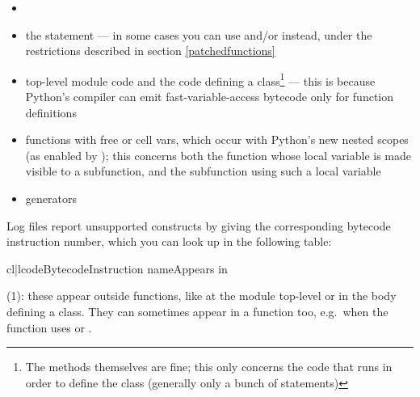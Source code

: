 \documentclass{manual}
\begin{document}
\begin{itemize}

\item {}

\item the  statement --- in some cases you can use  and/or  instead, under the restrictions described in section \ref{patchedfunctions}

\item top-level module code and the code defining a class\footnote{The methods themselves are fine; this only concerns the code that runs in order to define the class (generally only a bunch of  statements)} --- this is because Python's compiler can emit fast-variable-access bytecode only for function definitions

\item functions with free or cell vars, which occur with Python's new nested scopes (as enabled by ); this concerns both the function whose local variable is made visible to a subfunction, and the subfunction using such a local variable

\item generators

\end{itemize}

Log files report unsupported constructs by giving the corresponding bytecode instruction number, which you can look up in the following table:

\begin{tableiii}{cl|l}{code}{Bytecode}{Instruction name}{Appears in}
\end{tableiii}

(1): these appear outside functions, like at the module top-level or in the body defining a class.  They can sometimes appear in a function too, e.g.\ when the function uses  or .
\end{document}

